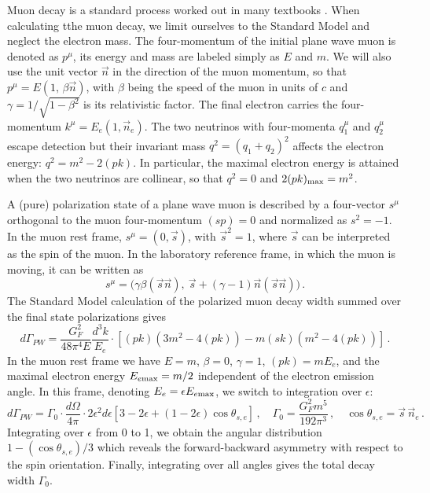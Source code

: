 \documentclass[aps,prd,longbibliography,nofootinbib,amsthm,amsmath,amssymb,amsfonts,notitlepage]{revtex4-1}
\begin{document}
Muon decay is a standard process worked out in many textbooks \cite{Okun:1982, Donoghue:1992dd}.
When calculating tthe muon decay, we limit ourselves to the Standard Model and neglect the electron mass.
The four-momentum of the initial plane wave muon is denoted as $p^\mu$, its energy and mass are labeled simply as $E$ and $m$.
We will also use the unit vector $\vec n$ in the direction of the muon momentum, so that
$p^\mu = E(1,\, \beta \vec n)$, with $\beta$ being the speed of the muon in units of $c$ and $\gamma = 1/\sqrt{1-\beta^2}$ is its relativistic factor.
The final electron carries the four-momentum $k^\mu = E_e (1, \vec n_e)$. The two neutrinos with four-momenta $q_1^\mu$
and $q_2^\mu$ escape detection but their invariant mass $q^2 = (q_1 + q_2)^2$
affects the electron energy: $q^2 = m^2 - 2 (pk)$. In particular, the maximal electron energy
is attained when the two neutrinos are collinear, so that $q^2=0$ and $2(pk)_{\rm max} = m^2$.

A (pure) polarization state of a plane wave muon is described by a four-vector $s^\mu$
orthogonal to the muon four-momentum $(sp) = 0$ and normalized as $s^2 = -1$.
In the muon rest frame, $s^\mu = (0, \vec s)$, with $\vec s^2 = 1$, where $\vec s$ can be interpreted as the spin
of the muon. In the laboratory reference frame, in which the muon is moving, it can be written as
\begin{equation}
s^\mu = \bigl(\gamma\beta (\vec s\vec n), \ \vec s + (\gamma-1)\vec n(\vec s\vec n)\bigr)\,.
\end{equation}
The Standard Model calculation of the polarized muon decay width summed over the final state polarizations gives
\begin{equation}
d\Gamma_{PW} = \frac{G_F^2}{48\pi^4 E} \frac{d^3 k}{E_e} \cdot \left[(pk)(3m^2 - 4(pk)) - m(sk)(m^2 - 4(pk))\right]\,.
\label{PWresult}
\end{equation}
In the muon rest frame we have $E = m$, $\beta=0$, $\gamma=1$, $(pk) = mE_e$,
and the maximal electron energy $E_{e\rm max} = m/2$ independent of the electron emission angle.
In this frame, denoting $E_e = \epsilon E_{e\rm max}$, we switch to integration over $\epsilon$:
\begin{equation}
d\Gamma_{PW} = \Gamma_0 \cdot \frac{d\Omega}{4\pi} \cdot 2 \epsilon^2 d\epsilon [3-2\epsilon + (1-2\epsilon)\cos\theta_{s,e}]\,,
\quad \Gamma_0 = \frac{G_F^2 m^5}{192\pi^3}\,, \quad \cos\theta_{s,e} = \vec s\,\vec n_e\,.
\label{PWresult-2}
\end{equation}
Integrating over $\epsilon$ from 0 to 1, we obtain the angular distribution $1-(\cos\theta_{s,e})/3$ which reveals the forward-backward asymmetry
with respect to the spin orientation. Finally, integrating over all angles gives the total decay width $\Gamma_0$.
\end{document}
